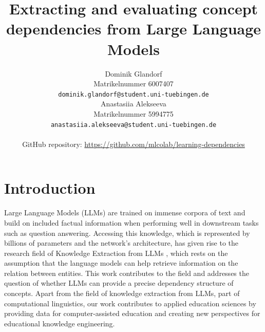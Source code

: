 \documentclass{article}
\title{Extracting and evaluating concept dependencies from Large Language Models}
\author{%
  Dominik Glandorf\\
  Matrikelnummer 6007407\\
  \texttt{dominik.glandorf@student.uni-tuebingen.de} \\
  \And
  Anastasiia Alekseeva\\
  Matrikelnummer 5994775\\
  \texttt{anastasiia.alekseeva@student.uni-tuebingen.de} \\
  \\
  GitHub repository: \url{https://github.com/mlcolab/learning-dependencies}
}
\begin{document}
\vspace*{-5mm}
\maketitle
\vspace*{-5mm}

\begin{abstract}





\end{abstract}

\section{Introduction}
Large Language Models (LLMs) are trained on immense corpora of text and build on included factual information when performing well in downstream tasks such as question answering. Accessing this knowledge, which is represented by billions of parameters and the network's architecture, has given rise to the research field of Knowledge Extraction from LLMs \citep{cohen2023crawling}, which rests on the assumption that the language models can help retrieve information on the relation between entities. This work contributes to the field and addresses the question of whether LLMs can provide a precise dependency structure of concepts. Apart from the field of knowledge extraction from LLMs, part of computational linguistics, our work contributes to applied education sciences by providing data for computer-assisted education and creating new perspectives for educational knowledge engineering.
\end{document}

